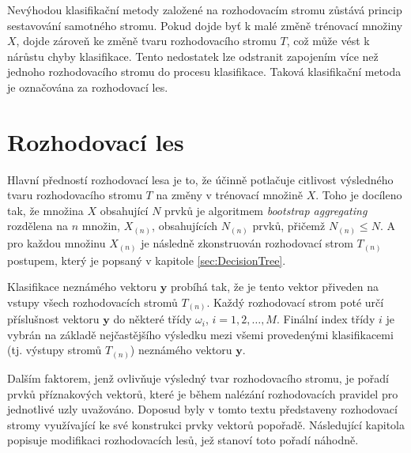 {\par{Nevýhodou klasifikační metody založené na rozhodovacím stromu zůstává princip sestavování samotného stromu. Pokud dojde byť k malé změně trénovací množiny $X$, dojde zároveň ke změně tvaru rozhodovacího stromu $T$, což může vést k nárůstu chyby klasifikace. Tento nedostatek lze odstranit zapojením více než jednoho rozhodovacího stromu do procesu klasifikace. Taková klasifikační metoda je označována za rozhodovací les.}









\newpage






\section{Rozhodovací les}
\label{sec:DecisionWald}
\par{Hlavní předností rozhodovací lesa je to, že účinně potlačuje citlivost výsledného tvaru rozhodovacího stromu $T$ na změny v trénovací množině $X$. Toho je docíleno tak, že množina $X$ obsahující $N$ prvků je algoritmem \textit{bootstrap aggregating} rozdělena na $n$ množin, $X_{\left(n\right)}$, obsahujících $N_{\left(n\right)}$ prvků, přičemž $N_{\left(n\right)}\leq N$. A pro každou množinu $X_{\left(n\right)}$ je následně zkonstruován rozhodovací strom $T_{\left(n\right)}$ postupem, který je popsaný v kapitole \ref{sec:DecisionTree}.}

\par{Klasifikace neznámého vektoru $\bm{y}$ probíhá tak, že je tento vektor přiveden na vstupy všech rozhodovacích stromů $T_{\left(n\right)}$. Každý rozhodovací strom poté určí příslušnost vektoru $\bm{y}$ do některé třídy $\omega_i$, $i=1,2,\ldots ,M$. Finální index třídy $i$ je vybrán na základě nejčastějšího výsledku mezi všemi provedenými klasifikacemi (tj. výstupy stromů $T_{\left(n\right)}$) neznámého vektoru $\bm{y}$.}

\par{Dalším faktorem, jenž ovlivňuje výsledný tvar rozhodovacího stromu, je pořadí prvků příznakových vektorů, které je během nalézání rozhodovacích pravidel pro jednotlivé uzly uvažováno. Doposud byly v tomto textu představeny rozhodovací stromy využívající
ke své konstrukci prvky vektorů popořadě. Následující kapitola popisuje modifikaci rozhodovacích lesů, jež stanoví toto pořadí náhodně.}



















}
